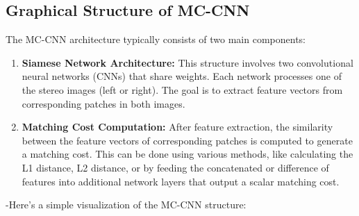 \documentclass[22pt]{report}
\begin{document}
\subsection{Graphical Structure of MC-CNN}
The MC-CNN architecture typically consists of two main components:
\begin{enumerate}
    \item \textbf{Siamese Network Architecture:} This structure involves two convolutional neural networks (CNNs) that share weights. Each network processes one of the stereo images (left or right). The goal is to extract feature vectors from corresponding patches in both images.
    \item \textbf{Matching Cost Computation:} After feature extraction, the similarity between the feature vectors of corresponding patches is computed to generate a matching cost. This can be done using various methods, like calculating the L1 distance, L2 distance, or by feeding the concatenated or difference of features into additional network layers that output a scalar matching cost.
\end{enumerate}
\vspace{15}

-Here’s a simple visualization of the MC-CNN structure: \\
\begin{center}
\end{center}
\vspace{25}
\end{document}
